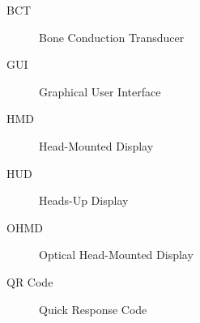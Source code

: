 \begin{description}
	\item [BCT] Bone Conduction Transducer
	\item [GUI] Graphical User Interface
	\item [HMD] Head-Mounted Display
	\item [HUD] Heads-Up Display
	\item [OHMD] Optical Head-Mounted Display
	\item [QR Code] Quick Response Code
\end{description}